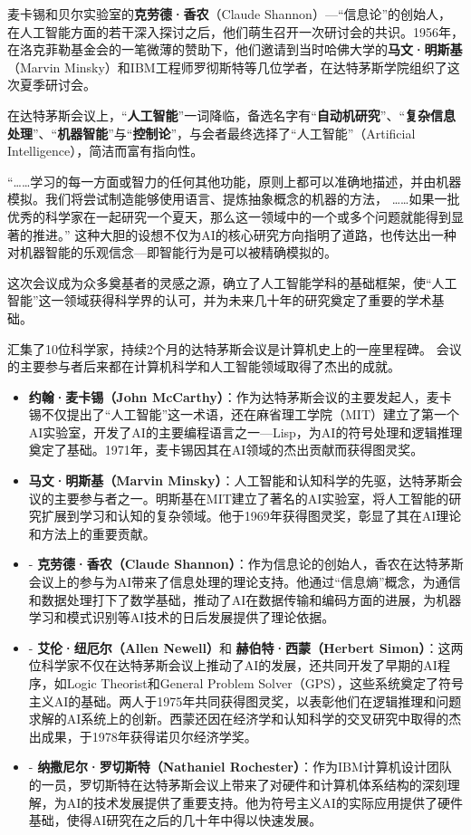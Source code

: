麦卡锡和贝尔实验室的{\bf 克劳德·香农}（Claude Shannon）---“信息论”的创始人，在人工智能方面的若干深入探讨之后，他们萌生召开一次研讨会的共识。1956年，在洛克菲勒基金会的一笔微薄的赞助下，他们邀请到当时哈佛大学的{\bf 马文·明斯基}（Marvin Minsky）和IBM工程师罗彻斯特等几位学者，在达特茅斯学院组织了这次夏季研讨会。

在达特茅斯会议上，“{\bf 人工智能}”一词降临，备选名字有“{\bf 自动机研究}”、“{\bf 复杂信息处理}”、“{\bf 机器智能}”与“{\bf 控制论}”，与会者最终选择了“人工智能”（Artificial Intelligence），简洁而富有指向性。


“……学习的每一方面或智力的任何其他功能，原则上都可以准确地描述，并由机器模拟。我们将尝试制造能够使用语言、提炼抽象概念的机器的方法，
……如果一批优秀的科学家在一起研究一个夏天，那么这一领域中的一个或多个问题就能得到显著的推进。”
这种大胆的设想不仅为AI的核心研究方向指明了道路，也传达出一种对机器智能的乐观信念---即智能行为是可以被精确模拟的。

这次会议成为众多奠基者的灵感之源，确立了人工智能学科的基础框架，使“人工智能”这一领域获得科学界的认可，并为未来几十年的研究奠定了重要的学术基础。


汇集了10位科学家，持续2个月的达特茅斯会议是计算机史上的一座里程碑。
会议的主要参与者后来都在计算机科学和人工智能领域取得了杰出的成就。
\begin{itemize}
\item  {\bf 约翰·麦卡锡（John McCarthy）}：作为达特茅斯会议的主要发起人，麦卡锡不仅提出了“人工智能”这一术语，还在麻省理工学院（MIT）建立了第一个AI实验室，开发了AI的主要编程语言之一---Lisp，为AI的符号处理和逻辑推理奠定了基础。1971年，麦卡锡因其在AI领域的杰出贡献而获得图灵奖。
\item  {\bf 马文·明斯基（Marvin Minsky）}：人工智能和认知科学的先驱，达特茅斯会议的主要参与者之一。明斯基在MIT建立了著名的AI实验室，将人工智能的研究扩展到学习和认知的复杂领域。他于1969年获得图灵奖，彰显了其在AI理论和方法上的重要贡献。
\item -  {\bf 克劳德·香农（Claude Shannon）}：作为信息论的创始人，香农在达特茅斯会议上的参与为AI带来了信息处理的理论支持。他通过“信息熵”概念，为通信和数据处理打下了数学基础，推动了AI在数据传输和编码方面的进展，为机器学习和模式识别等AI技术的日后发展提供了理论依据。
\item -  {\bf 艾伦·纽厄尔（Allen Newell）}和 {\bf 赫伯特·西蒙（Herbert Simon）}：这两位科学家不仅在达特茅斯会议上推动了AI的发展，还共同开发了早期的AI程序，如Logic Theorist和General Problem Solver（GPS），这些系统奠定了符号主义AI的基础。两人于1975年共同获得图灵奖，以表彰他们在逻辑推理和问题求解的AI系统上的创新。西蒙还因在经济学和认知科学的交叉研究中取得的杰出成果，于1978年获得诺贝尔经济学奖。
\item -  {\bf 纳撒尼尔·罗切斯特（Nathaniel Rochester）}：作为IBM计算机设计团队的一员，罗切斯特在达特茅斯会议上带来了对硬件和计算机体系结构的深刻理解，为AI的技术发展提供了重要支持。他为符号主义AI的实际应用提供了硬件基础，使得AI研究在之后的几十年中得以快速发展。
\end{itemize}

